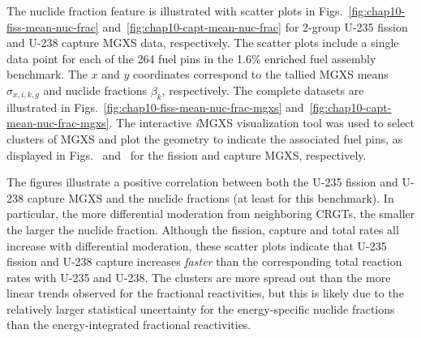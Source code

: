
The nuclide fraction feature is illustrated with scatter plots in Figs.~\ref{fig:chap10-fiss-mean-nuc-frac} and~\ref{fig:chap10-capt-mean-nuc-frac} for 2-group U-235 fission and U-238 capture \ac{MGXS} data, respectively. The scatter plots include a single data point for each of the 264 fuel pins in the 1.6\% enriched fuel assembly benchmark. The $x$ and $y$ coordinates correspond to the tallied \ac{MGXS} means $\hat{\sigma}_{x,i,k,g}$ and nuclide fractions $\beta_{k}$, respectively. The complete datasets are illustrated in Figs.~\ref{fig:chap10-fiss-mean-nuc-frac-mgxs} and~\ref{fig:chap10-capt-mean-nuc-frac-mgxs}. The interactive \textit{i}\ac{MGXS} visualization tool was used to select clusters of \ac{MGXS} and plot the geometry to indicate the associated fuel pins, as displayed in Figs.~ and~ for the fission and capture \ac{MGXS}, respectively. 

The figures illustrate a positive correlation between both the U-235 fission and U-238 capture \ac{MGXS} and the nuclide fractions (at least for this benchmark). In particular, the more differential moderation from neighboring \acp{CRGT}, the smaller the larger the nuclide fraction. Although the fission, capture and total rates all increase with differential moderation, these scatter plots indicate that U-235 fission and U-238 capture increases \textit{faster} than the corresponding total reaction rates with U-235 and U-238. The clusters are more spread out than the more linear trends observed for the fractional reactivities, but this is likely due to the relatively larger statistical uncertainty for the energy-specific nuclide fractions than the energy-integrated fractional reactivities.

%
%

